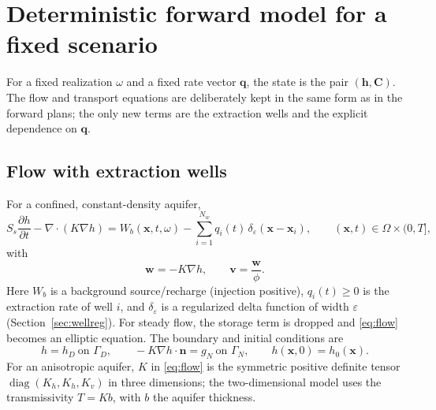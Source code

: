 \documentclass[11pt]{article}
\numberwithin{equation}{section}
\newcommand{\pdd}[2]{\frac{\partial #1}{\partial #2}}
\newcommand{\xx}{\mathbf{x}}
\newcommand{\vv}{\mathbf{v}}
\newcommand{\ww}{\mathbf{w}}
\newcommand{\nn}{\mathbf{n}}
\theoremstyle{plain}
\begin{document}
\section{Deterministic forward model for a fixed scenario}
\label{sec:forward}

For a fixed realization $\omega$ and a fixed rate vector $\mathbf{q}$, the
state is the pair $(\mathbf{h},\mathbf{C})$.  The flow and transport equations
are deliberately kept in the same form as in the forward plans; the only new
terms are the extraction wells and the explicit dependence on $\mathbf{q}$.

\subsection{Flow with extraction wells}
\label{sec:flow}

For a confined, constant-density aquifer,
\begin{equation}
\label{eq:flow}
S_s\pdd{h}{t}
-\nabla\cdot(K\nabla h)
= W_b(\xx,t,\omega)
-\sum_{i=1}^{N_w} q_i(t)\,\delta_{\varepsilon}(\xx-\xx_i),
\qquad (\xx,t)\in\Omega\times(0,T],
\end{equation}
with
\begin{equation}
\label{eq:darcy}
\ww=-K\nabla h,
\qquad
\vv=\frac{\ww}{\phi}.
\end{equation}
Here $W_b$ is a background source/recharge (injection positive), $q_i(t)\ge0$
is the extraction rate of well $i$, and $\delta_{\varepsilon}$ is a
regularized delta function of width $\varepsilon$ (Section~\ref{sec:wellreg}).
For steady flow, the storage term is dropped and \eqref{eq:flow} becomes an
elliptic equation.  The boundary and initial conditions are
\begin{equation}
\label{eq:flowbc}
h=h_D\ \text{on }\Gamma_D,
\qquad
-K\nabla h\cdot\nn=g_N\ \text{on }\Gamma_N,
\qquad
h(\xx,0)=h_0(\xx).
\end{equation}
For an anisotropic aquifer, $K$ in \eqref{eq:flow} is the symmetric positive
definite tensor $\operatorname{diag}(K_h,K_h,K_v)$ in three dimensions; the
two-dimensional model uses the transmissivity $T=Kb$, with $b$ the aquifer
thickness.
\end{document}
